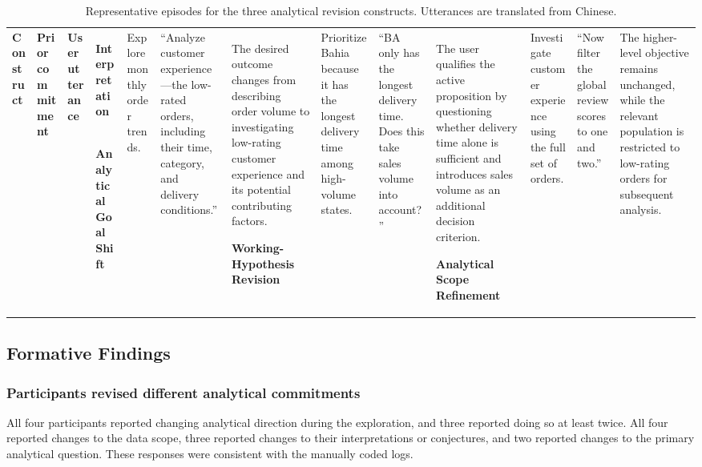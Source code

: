 \documentclass[journal]{IEEEtran}
\begin{document}
\begin{table}[t]
\centering
\caption{Representative episodes for the three analytical revision
constructs. Utterances are translated from Chinese.}
\label{tab:formative-episodes}
\small
\begin{tabular}{
p{}
p{}
p{}
p{}}
\toprule
\textbf{Construct} &
\textbf{Prior commitment} &
\textbf{User utterance} &
\textbf{Interpretation} \
\midrule

\textbf{Analytical Goal Shift} &
Explore monthly order trends. &
``Analyze customer experience---the low-rated orders, including their time,
category, and delivery conditions.'' &
The desired outcome changes from describing order volume to investigating
low-rating customer experience and its potential contributing factors. \

\textbf{Working-Hypothesis Revision} &
Prioritize Bahia because it has the longest delivery time among high-volume
states. &
``BA only has the longest delivery time. Does this take sales volume into
account?'' &
The user qualifies the active proposition by questioning whether delivery
time alone is sufficient and introduces sales volume as an additional
decision criterion. \

\textbf{Analytical Scope Refinement} &
Investigate customer experience using the full set of orders. &
``Now filter the global review scores to one and two.'' &
The higher-level objective remains unchanged, while the relevant population is
restricted to low-rating orders for subsequent analysis. \

\bottomrule
\end{tabular}
\end{table}

\subsection{Formative Findings}
\label{sec:formative-findings}

\subsubsection{Participants revised different analytical commitments}

All four participants reported changing analytical direction during the
exploration, and three reported doing so at least twice. All four reported
changes to the data scope, three reported changes to their interpretations or
conjectures, and two reported changes to the primary analytical question.
These responses were consistent with the manually coded logs.
\end{document}
